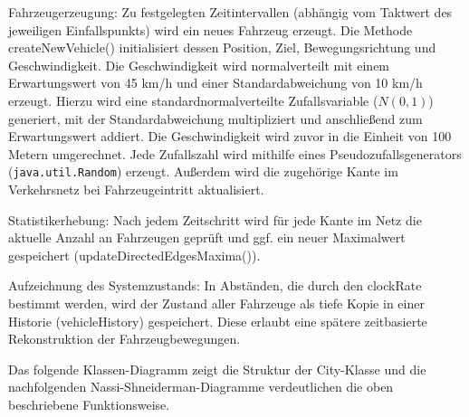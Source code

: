 Fahrzeugerzeugung: Zu festgelegten Zeitintervallen (abhängig vom Taktwert des jeweiligen Einfallspunkts) wird ein neues Fahrzeug erzeugt.
Die Methode createNewVehicle() initialisiert dessen Position, Ziel, Bewegungsrichtung und Geschwindigkeit.
Die Geschwindigkeit wird normalverteilt mit einem Erwartungswert von 45 km/h und einer Standardabweichung von 10 km/h erzeugt.
Hierzu wird eine standardnormalverteilte Zufallsvariable (\(N(0,1)\)) generiert, mit der Standardabweichung multipliziert und anschließend zum Erwartungswert addiert.
Die Geschwindigkeit wird zuvor in die Einheit von 100 Metern umgerechnet.
Jede Zufallszahl wird mithilfe eines Pseudozufallsgenerators (\texttt{java.util.Random}) erzeugt.
Außerdem wird die zugehörige Kante im Verkehrsnetz bei Fahrzeugeintritt aktualisiert.

Statistikerhebung: Nach jedem Zeitschritt wird für jede Kante im Netz die aktuelle Anzahl an Fahrzeugen geprüft und ggf. ein neuer Maximalwert gespeichert (updateDirectedEdgesMaxima()).

Aufzeichnung des Systemzustands: In Abständen, die durch den clockRate bestimmt werden,
wird der Zustand aller Fahrzeuge als tiefe Kopie in einer Historie (vehicleHistory) gespeichert.
Diese erlaubt eine spätere zeitbasierte Rekonstruktion der Fahrzeugbewegungen.

Das folgende Klassen-Diagramm zeigt die Struktur der City-Klasse und die nachfolgenden Nassi-Shneiderman-Diagramme verdeutlichen die oben beschriebene Funktionsweise.

\begin{figure}[h!]
    \centering
\end{figure}


